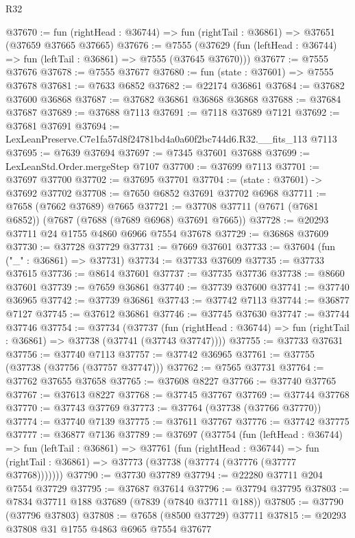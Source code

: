 \begin{lexlean}{R32}
\begin{coremodule}
@37670 := fun (rightHead : @36744) => fun (rightTail : @36861) => @37651 (@37659 @37665 @37665)
@37676 := @7555
    (@37629 (fun (leftHead : @36744) => fun (leftTail : @36861) => @7555 (@37645 @37670)))
@37677 := @7555 @37676
@37678 := @7555 @37677
@37680 := fun (state : @37601) => @7555 @37678
@37681 := @7633 @6852
@37682 := @22174 @36861
@37684 := @37682 @37600 @36868
@37687 := @37682 @36861 @36868 @36868
@37688 := @37684 @37687
@37689 := @37688 @7113
@37691 := @7118 @37689 @7121
@37692 := @37681 @37691
@37694 := LexLeanPreserve.C7e1fa57d8f24781bd4a0a60f2bc744d6.R32.__fits_113 @7113
@37695 := @7639 @37694
@37697 := @7345 @37601 @37688
@37699 := LexLeanStd.Order.mergeStep @7107
@37700 := @37699 @7113
@37701 := @37697 @37700
@37702 := @37695 @37701
@37704 := (state : @37601) -> @37692 @37702
@37708 := @7650 @6852 @37691 @37702 @6968
@37711 := @7658 (@7662 @37689) @7665
@37721 := @37708 @37711 (@7671 (@7681 @6852)) (@7687 (@7688 (@7689 @6968) @37691 @7665))
@37728 := @20293 @37711 @24 @1755 @4860 @6966 @7554 @37678
@37729 := @36868 @37609
@37730 := @37728 @37729
@37731 := @7669 @37601
@37733 := @37604 (fun ("_" : @36861) => @37731)
@37734 := @37733 @37609
@37735 := @37733 @37615
@37736 := @8614 @37601
@37737 := @37735 @37736
@37738 := @8660 @37601
@37739 := @7659 @36861
@37740 := @37739 @37600
@37741 := @37740 @36965
@37742 := @37739 @36861
@37743 := @37742 @7113
@37744 := @36877 @7127
@37745 := @37612 @36861
@37746 := @37745 @37630
@37747 := @37744 @37746
@37754 := @37734
    (@37737
      (fun (rightHead : @36744) => fun (rightTail : @36861) => @37738 (@37741 (@37743 @37747))))
@37755 := @37733 @37631
@37756 := @37740 @7113
@37757 := @37742 @36965
@37761 := @37755 (@37738 (@37756 (@37757 @37747)))
@37762 := @7565 @37731
@37764 := @37762 @37655 @37658
@37765 := @37608 @8227
@37766 := @37740 @37765
@37767 := @37613 @8227
@37768 := @37745 @37767
@37769 := @37744 @37768
@37770 := @37743 @37769
@37773 := @37764 (@37738 (@37766 @37770))
@37774 := @37740 @7139
@37775 := @37611 @37767
@37776 := @37742 @37775
@37777 := @36877 @7136
@37789 := @37697
    (@37754
      (fun (leftHead : @36744) =>
      fun (leftTail : @36861) =>
      @37761
        (fun (rightHead : @36744) =>
        fun (rightTail : @36861) => @37773 (@37738 (@37774 (@37776 (@37777 @37768)))))))
@37790 := @37730 @37789
@37794 := @22280 @37711 @204 @7554 @37729
@37795 := @37687 @37614
@37796 := @37794 @37795
@37803 := @7834 @37711 @188 @37689 (@7839 (@7840 @37711 @188))
@37805 := @37790 (@37796 @37803)
@37808 := @7658 (@8500 @37729) @37711
@37815 := @20293 @37808 @31 @1755 @4863 @6965 @7554 @37677

\end{coremodule}
\end{lexlean}

